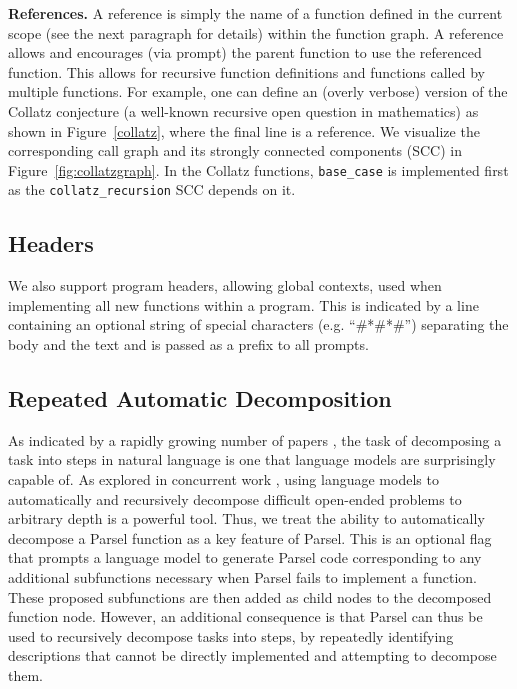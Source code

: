 \textbf{References.} A reference is simply the name of a function defined in the current scope (see the next paragraph for details) within the function graph. A reference allows and encourages (via prompt) the parent function to use the referenced function. This allows for recursive function definitions and functions called by multiple functions.
For example, one can define an (overly verbose) version of the Collatz conjecture (a well-known recursive open question in mathematics) as shown in Figure~\ref{collatz}, where the final line is a reference. We visualize the corresponding call graph and its strongly connected components (SCC) in Figure~\ref{fig:collatzgraph}. In the Collatz functions, \lstinline{base_case} is implemented first as the \lstinline{collatz_recursion} SCC depends on it.



\subsection{Headers}
We also support program headers, allowing global contexts, used when implementing all new functions within a program. This is indicated by a line containing an optional string of special characters (e.g. ``\#*\#*\#'') separating the body and the text and is passed as a prefix to all prompts.

\subsection{Repeated Automatic Decomposition}
\label{autodecomp}
As indicated by a rapidly growing number of papers \citep{brohan2022can, huang2022language}, the task of decomposing a task into steps in natural language is one that language models are surprisingly capable of. As explored in concurrent work \citep{primer2022}, using language models to automatically and recursively decompose difficult open-ended problems to arbitrary depth is a powerful tool. Thus, we treat the ability to automatically decompose a Parsel function as a key feature of Parsel. This is an optional flag that prompts a language model to generate Parsel code corresponding to any additional subfunctions necessary when Parsel fails to implement a function. These proposed subfunctions are then added as child nodes to the decomposed function node. However, an additional consequence is that Parsel can thus be used to recursively decompose tasks into steps, by repeatedly identifying descriptions that cannot be directly implemented and attempting to decompose them.


